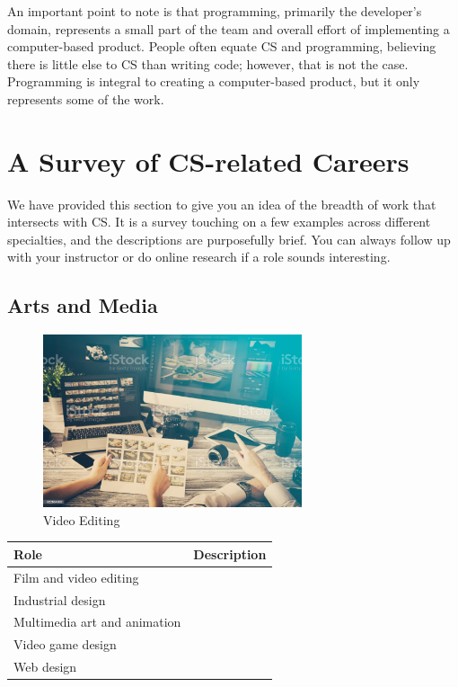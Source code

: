 An important point to note is that programming, primarily the developer's domain, represents a small part of the team and overall effort of implementing a computer-based product. People often equate CS and programming, believing there is little else to CS than writing code; however, that is not the case. Programming is integral to creating a computer-based product, but it only represents some of the work.



\section{A Survey of CS-related Careers}

We have provided this section to give you an idea of the breadth of work that intersects with CS. It is a survey touching on a few examples across different specialties, and the descriptions are purposefully brief. You can always follow up with your instructor or do online research if a role sounds interesting.

\subsection{Arts and Media}

\begin{figure}[H]
	\begin{center}
		\caption{Video Editing}
		\vskip 4pt
		\includegraphics[height=2in]{images/careers/istockphoto-922654000-1024x1024.jpg}
	\end{center}
\end{figure}

\begin{table}[H]
	\begin{center}
		\begin{tabular}{p{1.5in}|p{2.9in}} 
			\textbf{Role} & \textbf{Description}\\
			\hline
			Film and video editing & \\
			\hline
			Industrial design & \\
			\hline
			Multimedia art and animation & \\
			\hline
			Video game design & \\
			\hline
			Web design & \\
		\end{tabular}
	\end{center}
\end{table}


